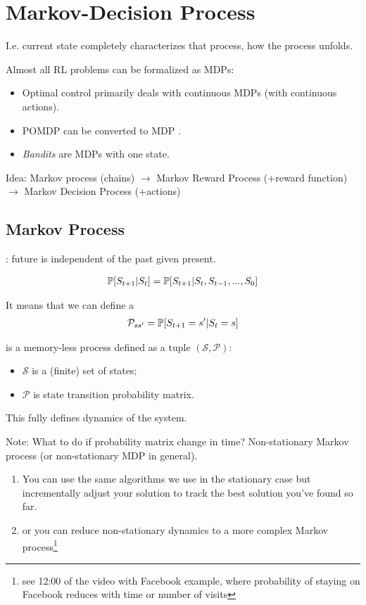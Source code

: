 \section{Markov-Decision Process}


I.e. current state completely characterizes that process, how the process unfolds.

Almost all RL problems can be formalized as MDPs:
\begin{itemize}
	\item Optimal control primarily deals with continuous MDPs (with continuous actions).
	\item POMDP can be converted to MDP	.
	\item \textit{Bandits} are MDPs with one state.
\end{itemize}

Idea: Markov process (chains) $\to$ Markov Reward Process (+reward function) $\to$ Markov Decision Process (+actions)

\subsection{Markov Process}

: future is independent of the past given present.

\begin{align}
	\mathbb{P}[S_{t+1} | S_t] = 	\mathbb{P}[S_{t+1} | S_t, S_{t-1}, ..., S_{0}]
\end{align}

It means that we can define a 
\begin{align}
	\mathcal{P}_{ss'} = \mathbb{P}[S_{t+1} = s' | S_t = s]
\end{align}

 is a memory-less process defined as a tuple $(\mathcal{S}, \mathcal{P})$:
\begin{itemize}
	\item $\mathcal{S}$ is a (finite) set of states;
	\item $\mathcal{P}$ is state transition probability matrix.
\end{itemize}

This fully defines dynamics of the system.

Note: What to do if probability matrix change in time? Non-stationary Markov process (or non-stationary MDP in general).
\begin{enumerate}
	\item  You can use the same algorithms we use in the stationary case but incrementally adjust your solution to track the best solution you've found so far.
	\item or you can reduce non-stationary dynamics to a more complex Markov process\footnote{see 12:00 of the video with Facebook example, where probability of staying on Facebook reduces with time or number of visits}
\end{enumerate}

